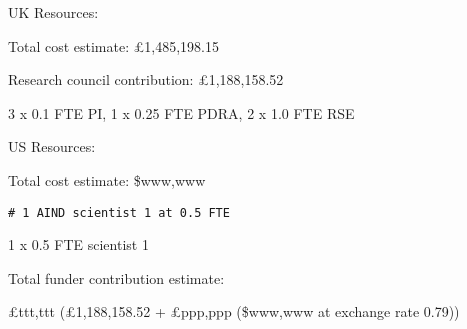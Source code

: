 
UK Resources:

Total cost estimate: £1,485,198.15

Research council contribution: £1,188,158.52

3 x 0.1 FTE PI, 1 x 0.25 FTE PDRA, 2 x 1.0 FTE RSE

\vspace{0.1in}
US Resources:

Total cost estimate: \$www,www

\texttt{\# 1 AIND scientist 1 at 0.5 FTE}

1 x 0.5 FTE scientist 1

\vspace{0.1in}
Total funder contribution estimate:

£ttt,ttt (£1,188,158.52 + £ppp,ppp (\$www,www at exchange rate 0.79))

